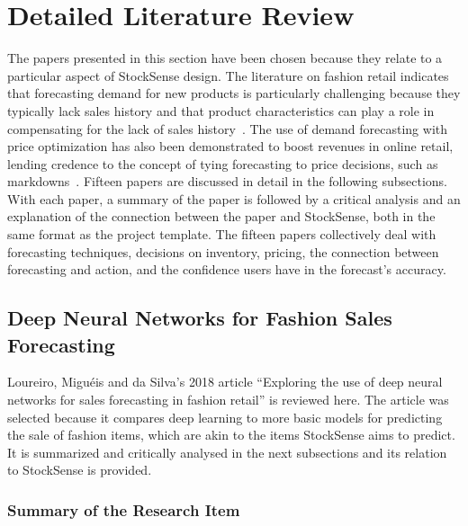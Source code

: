 \documentclass{StockSense}
\begin{document}
\section{Detailed Literature Review}

The papers presented in this section have been chosen because they relate to a particular aspect of StockSense design. The literature on fashion retail indicates that forecasting demand for new products is particularly challenging because they typically lack sales history and that product characteristics can play a role in compensating for the lack of sales history~\cite{singh2019fashion}. The use of demand forecasting with price optimization has also been demonstrated to boost revenues in online retail, lending credence to the concept of tying forecasting to price decisions, such as markdowns~\cite{ferreira2016analytics}. Fifteen papers are discussed in detail in the following subsections. With each paper, a summary of the paper is followed by a critical analysis and an explanation of the connection between the paper and StockSense, both in the same format as the project template. The fifteen papers collectively deal with forecasting techniques, decisions on inventory, pricing, the connection between forecasting and action, and the confidence users have in the forecast's accuracy.

\subsection{Deep Neural Networks for Fashion Sales Forecasting}

Loureiro, Migu\'eis and da Silva's 2018 article ``Exploring the use of deep neural networks for sales forecasting in fashion retail'' is reviewed here. The article was selected because it compares deep learning to more basic models for predicting the sale of fashion items, which are akin to the items StockSense aims to predict. It is summarized and critically analysed in the next subsections and its relation to StockSense is provided.

\subsubsection{Summary of the Research Item}
\end{document}
